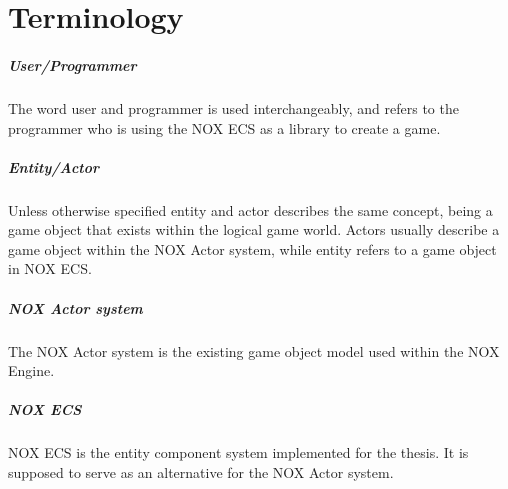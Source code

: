 \section{Terminology}
\subparagraph{User/Programmer}
The word user and programmer is used interchangeably, and refers to the programmer who is using
the NOX ECS as a library to create a game.

\subparagraph{Entity/Actor}
Unless otherwise specified entity and actor describes the same concept, being a game object that exists within the logical game world.
Actors usually describe a game object within the NOX Actor system, while entity refers to a game object in NOX ECS.

\subparagraph{NOX Actor system}
The NOX Actor system is the existing game object model used within the NOX Engine.

\subparagraph{NOX ECS}
NOX ECS is the entity component system implemented for the thesis. It is supposed to serve as an alternative for the NOX Actor system.
